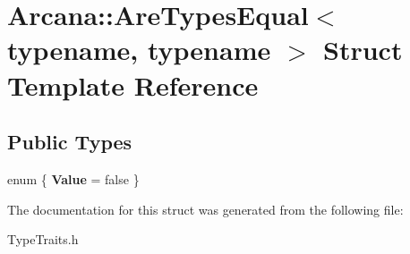 \hypertarget{struct_arcana_1_1_are_types_equal}{}\section{Arcana\+:\+:Are\+Types\+Equal$<$ typename, typename $>$ Struct Template Reference}
\label{struct_arcana_1_1_are_types_equal}
\subsection*{Public Types}
\begin{DoxyCompactItemize}
\item 
\mbox{\label{struct_arcana_1_1_are_types_equal_a41316d5fe9a645a3f71a6d1b2d9a985b}} 
enum \{ {\bfseries Value} = false
 \}
\end{DoxyCompactItemize}


The documentation for this struct was generated from the following file\+:\begin{DoxyCompactItemize}
\item 
Type\+Traits.\+h\end{DoxyCompactItemize}
